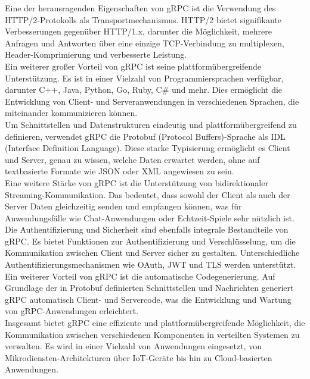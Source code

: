Eine der herausragenden Eigenschaften von gRPC ist die Verwendung des HTTP/2-Protokolls als Transportmechanismus. HTTP/2 bietet signifikante Verbesserungen gegenüber HTTP/1.x, darunter die Möglichkeit, mehrere Anfragen und Antworten über eine einzige TCP-Verbindung zu multiplexen, Header-Komprimierung und verbesserte Leistung.\\

Ein weiterer großer Vorteil von gRPC ist seine plattformübergreifende Unterstützung. Es ist in einer Vielzahl von Programmiersprachen verfügbar, darunter C++, Java, Python, Go, Ruby, C\# und mehr. Dies ermöglicht die Entwicklung von Client- und Serveranwendungen in verschiedenen Sprachen, die miteinander kommunizieren können.\\

Um Schnittstellen und Datenstrukturen eindeutig und plattformübergreifend zu definieren, verwendet gRPC die Protobuf (Protocol Buffers)-Sprache als IDL (Interface Definition Language). Diese starke Typisierung ermöglicht es Client und Server, genau zu wissen, welche Daten erwartet werden, ohne auf textbasierte Formate wie JSON oder XML angewiesen zu sein.\\

Eine weitere Stärke von gRPC ist die Unterstützung von bidirektionaler Streaming-Kommunikation. Das bedeutet, dass sowohl der Client als auch der Server Daten gleichzeitig senden und empfangen können, was für Anwendungsfälle wie Chat-Anwendungen oder Echtzeit-Spiele sehr nützlich ist.\\

Die Authentifizierung und Sicherheit sind ebenfalls integrale Bestandteile von gRPC. Es bietet Funktionen zur Authentifizierung und Verschlüsselung, um die Kommunikation zwischen Client und Server sicher zu gestalten. Unterschiedliche Authentifizierungsmechanismen wie OAuth, JWT und TLS werden unterstützt.\\

Ein weiterer Vorteil von gRPC ist die automatische Codegenerierung. Auf Grundlage der in Protobuf definierten Schnittstellen und Nachrichten generiert gRPC automatisch Client- und Servercode, was die Entwicklung und Wartung von gRPC-Anwendungen erleichtert.\\

Insgesamt bietet gRPC eine effiziente und plattformübergreifende Möglichkeit, die Kommunikation zwischen verschiedenen Komponenten in verteilten Systemen zu verwalten. Es wird in einer Vielzahl von Anwendungen eingesetzt, von Mikrodiensten-Architekturen über IoT-Geräte bis hin zu Cloud-basierten Anwendungen.\\

